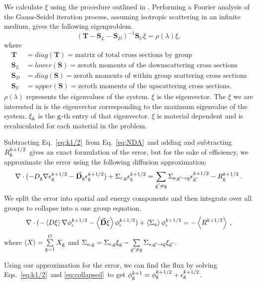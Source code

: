   We calculate $\xi$ using the procedure outlined in \cite{evans-upscat}. Performing a Fourier analysis of the Gauss-Seidel iteration process, assuming isotropic scattering in an infinite medium, gives the following eigenproblem. 
  \begin{equation}
      (\textbf{T} - \textbf{S}_L - \textbf{S}_D)^{-1}\textbf{S}_U \xi = \rho(\lambda)\xi,
  \end{equation}
  where
  \begin{align*}
      \textbf{T} &= diag(\textbf{T}) =  \text{matrix of total cross sections by group} \\
      \textbf{S}_L &= lower(\textbf{S}) = \text{zeroth moments of the downscattering cross sections} \\
      \textbf{S}_D &= diag(\textbf{S}) = \text{zeroth moments of within group scattering cross sections} \\
      \textbf{S}_U &= upper(\textbf{S}) = \text{zeroth moments of the upscattering cross sections.}
  \end{align*}
  $\rho(\lambda)$ represents the eigenvalues of the system. $\xi$ is the eigenvector. The $\xi$ we are interested in is the eigenvector corresponding to the maximum eigenvalue of the system. $\xi_{\mathrm{g}}$ is the $\mathrm{g}$-th entry of that eigenvector. $\xi$ is material dependent and is recaluculated for each material in the problem.
  \par
  Subtracting Eq.\ \eqref{eq:k1/2}\ from Eq.\ \eqref{eq:NDA}\ and adding and subtracting $R_{\mathrm{g}}^{k+1/2}$\ gives an exact formulation of the error, but for the sake of efficiency, we approximate the error using the following diffusion approximation:
  \begin{equation}
  \nabla\cdot(-D_{\mathrm{g}}  \nabla \epsilon_{\mathrm{g}}^{k+1/2} - \vec{\bf D}_{\mathrm{g}}
  \epsilon_{\mathrm{g}}^{k+1/2}) + \Sigma_{r,\mathrm{g}}  \epsilon_{\mathrm{g}}^{k+1/2} =  \sum\limits_{\substack{{\mathrm{g}'}\neq\mathrm{g}}} \Sigma_{\mathrm{s},\mathrm{g}' \to\mathrm{g}}  \epsilon_{\mathrm{g}'}^{k+1/2} -  R^{k+1/2}_{\mathrm{g}} \:.
  \end{equation}
  We split the error into spatial and energy components and then integrate over all groups to collapse into a one group equation.
  \begin{equation}
  \nabla\cdot(-\left< D \xi \right> \nabla \phi_{\epsilon}^{k+1/2} - \left<\vec{\bf D} \xi
  \right> \phi_{\epsilon}^{k+1/2}) + \left< \Sigma_{a} \right> \phi_{\epsilon}^{k+1/2} = - \left< R^{k+1/2} \right> \:,\label{eq:collapsed}
  \end{equation}
  where $\left< X \right> = \sum\limits_{\mathrm{g} = 1}^G X_{\mathrm{g}} $ and $\Sigma_{a,\mathrm{g}}  = \Sigma_{r,\mathrm{g}}\xi_{\mathrm{g}} - \sum\limits_{{\mathrm{g}'}\neq\mathrm{g}} \Sigma_{s,\mathrm{g}'\rightarrow \mathrm{g}} \xi_{\mathrm{g}'}$.
  \par
  Using our approximation for the error, we can find the flux by solving Eqs.\ \eqref{eq:k1/2}\ and \eqref{eq:collapsed}\ to get $\phi_{\mathrm{g}}^{k+1} = \phi_{\mathrm{g}}^{k+1/2} + \epsilon_{\mathrm{g}}^{k+1/2}$.
